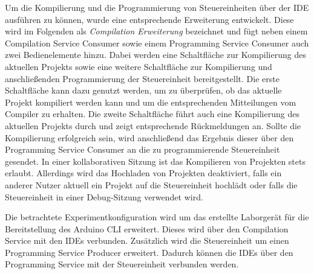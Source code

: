 Um die Kompilierung und die Programmierung von Steuereinheiten über der IDE ausführen zu können, wurde eine entsprechende Erweiterung entwickelt. Diese wird im Folgenden als \textit{Compilation Erweiterung} bezeichnet und fügt neben einem Compilation Service Consumer sowie einem Programming Service Consumer auch zwei Bedienelemente hinzu. Dabei werden eine Schaltfläche zur Kompilierung des aktuellen Projekts sowie eine weitere Schaltfläche zur Kompilierung und anschließenden Programmierung der Steuereinheit bereitgestellt. Die erste Schaltfläche kann dazu genutzt werden, um zu überprüfen, ob das aktuelle Projekt kompiliert werden kann und um die entsprechenden Mitteilungen vom Compiler zu erhalten. Die zweite Schaltfläche führt auch eine Kompilierung des aktuellen Projekts durch und zeigt entsprechende Rückmeldungen an. Sollte die Kompilierung erfolgreich sein, wird anschließend das Ergebnis dieser über den Programming Service Consumer an die zu programmierende Steuereinheit gesendet. In einer kollaborativen Sitzung ist das Kompilieren von Projekten stets erlaubt. Allerdings wird das Hochladen von Projekten deaktiviert, falls ein anderer Nutzer aktuell ein Projekt auf die Steuereinheit hochlädt oder falls die Steuereinheit in einer Debug-Sitzung verwendet wird.

Die betrachtete Experimentkonfiguration wird um das erstellte Laborgerät für die Bereitstellung des Arduino CLI erweitert. Dieses wird über den Compilation Service mit den IDEs verbunden. Zusätzlich wird die Steuereinheit um einen Programming Service Producer erweitert. Dadurch können die IDEs über den Programming Service mit der Steuereinheit verbunden werden.